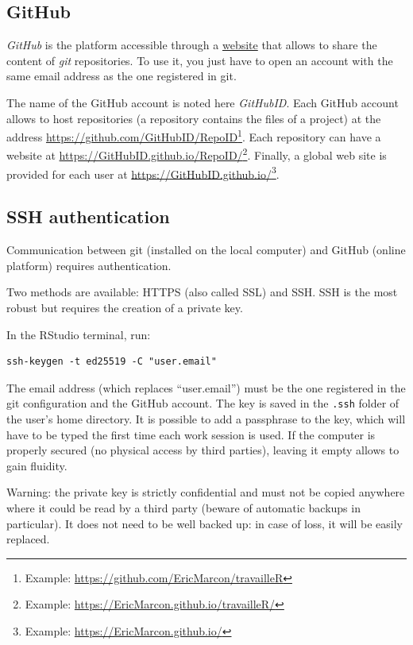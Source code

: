 \documentclass[
  12pt,
  american,
  a4paper,
  extrafontsizes,onecolumn,openright
  ]{memoir}
\begin{document}
\subsection{GitHub}\label{github}

\emph{GitHub} is the platform accessible through a \href{https://github.com/}{website} that allows to share the content of \emph{git} repositories.
To use it, you just have to open an account with the same email address as the one registered in git.

The name of the GitHub account is noted here \emph{GitHubID}.
Each GitHub account allows to host repositories (a repository contains the files of a project) at the address \url{https://github.com/GitHubID/RepoID}\footnote{Example: \url{https://github.com/EricMarcon/travailleR}}.
Each repository can have a website at \url{https://GitHubID.github.io/RepoID/}\footnote{Example: \url{https://EricMarcon.github.io/travailleR/}}.
Finally, a global web site is provided for each user at \url{https://GitHubID.github.io/}\footnote{Example: \url{https://EricMarcon.github.io/}}.

\subsection{SSH authentication}\label{sec:SSH}

Communication between git (installed on the local computer) and GitHub (online platform) requires authentication.

Two methods are available: HTTPS (also called SSL) and SSH.
SSH is the most robust but requires the creation of a private key.

In the RStudio terminal, run:

\begin{verbatim}
ssh-keygen -t ed25519 -C "user.email"
\end{verbatim}

The email address (which replaces \enquote{user.email}) must be the one registered in the git configuration and the GitHub account.
The key is saved in the \texttt{.ssh} folder of the user's home directory.
It is possible to add a passphrase to the key, which will have to be typed the first time each work session is used.
If the computer is properly secured (no physical access by third parties), leaving it empty allows to gain fluidity.

Warning: the private key is strictly confidential and must not be copied anywhere where it could be read by a third party (beware of automatic backups in particular).
It does not need to be well backed up: in case of loss, it will be easily replaced.
\end{document}
